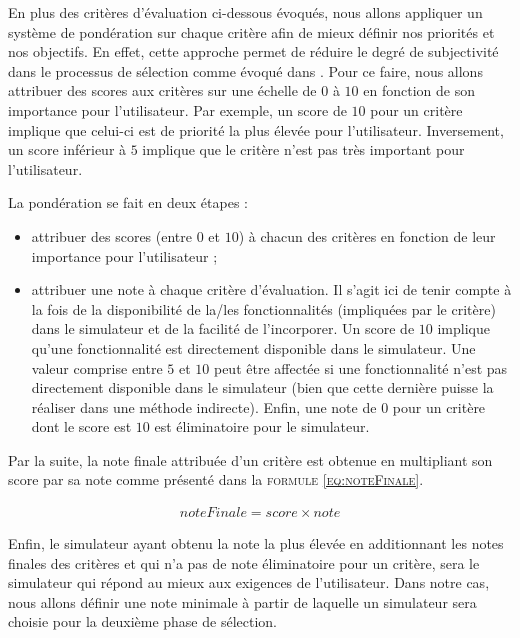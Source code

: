 En plus des critères d'évaluation ci-dessous évoqués, nous allons appliquer un système de pondération sur chaque critère afin de mieux définir nos priorités et nos objectifs. En effet, cette approche permet de réduire le degré de subjectivité dans le processus de sélection comme évoqué dans \cite{xiao2005methodology}. Pour ce faire, nous allons attribuer des scores aux critères sur une échelle de $0$ à $10$ en fonction de son importance pour l'utilisateur. Par exemple, un score de $10$ pour un critère implique que celui-ci est de priorité la plus élevée pour l'utilisateur. Inversement, un score inférieur à $5$ implique que le critère n'est pas très important pour l'utilisateur.

La pondération se fait en deux étapes : 

\begin{itemize}
    \item attribuer des scores (entre $0$ et $10$) à chacun des critères en fonction de leur importance pour l'utilisateur ;
    \item attribuer une note à chaque critère d'évaluation. Il s'agit ici de tenir compte à la fois de la disponibilité de la/les fonctionnalités (impliquées par le critère) dans le simulateur et de la facilité de l'incorporer. Un score de $10$ implique qu'une fonctionnalité est directement disponible dans le simulateur. Une valeur comprise entre $5$ et $10$ peut être affectée si une fonctionnalité n'est pas directement disponible dans le simulateur (bien que cette dernière puisse la réaliser dans une méthode indirecte). Enfin, une note de $0$ pour un critère dont le score est $10$ est éliminatoire pour le simulateur.
\end{itemize}

Par la suite, la note finale attribuée d'un critère est obtenue en multipliant son score par sa note comme présenté dans la \textsc{formule \ref{eq:noteFinale}}. 

\begin{gather}\label{eq:noteFinale}
noteFinale = score \times note
\end{gather}

Enfin, le simulateur ayant obtenu la note la plus élevée en additionnant les notes finales des critères et qui n'a pas de note éliminatoire pour un critère, sera le simulateur qui répond au mieux aux exigences de l'utilisateur. Dans notre cas, nous allons définir une note minimale à partir de laquelle un simulateur sera choisie pour la deuxième phase de sélection. 


